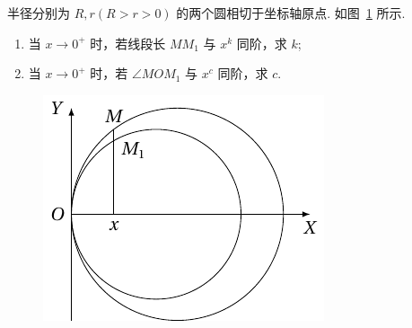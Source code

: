 	\begin{ti}
		半径分别为 $R,r(R>r>0)$ 的两个圆相切于坐标轴原点. 如图~\ref{fig:1.1.1} 所示.
		\begin{enumerate}
			\item 当 $x \to 0^{+}$ 时，若线段长 $MM_{1}$ 与 $x^{k}$ 同阶，求 $k$;
			\item 当 $x \to 0^{+}$ 时，若 $\angle MOM_{1}$ 与 $x^{c}$ 同阶，求 $c$.
		\end{enumerate}
		\begin{figure}[htbp]
			\centering
			\includegraphics[scale=1]{figure/fig1-1-1.pdf}
			\caption{}\label{fig:1.1.1}
		\end{figure}
	\end{ti}